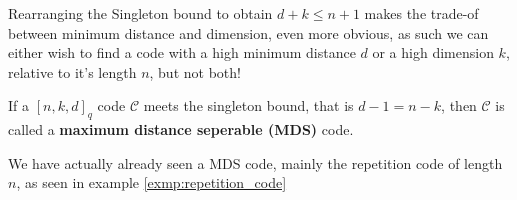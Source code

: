 \begin{remark}
  Rearranging the Singleton bound to obtain $d + k \leq n + 1$ makes the trade-of between minimum distance and dimension, even more obvious, as such we can either wish to find a code with a high minimum distance $d$ or a high dimension $k$, relative to it's length $n$, but not both!
\end{remark}

\begin{definition}\label{def:MDS_code}
  If a $[n, k, d]_{q}$ code $\mathcal{C}$ meets the singleton bound, that is $d - 1 = n - k$, then $\mathcal{C}$ is called a \textbf{maximum distance seperable (MDS)} code.
\end{definition}
We have actually already seen a MDS code, mainly the repetition code of length $n$, as seen in example \ref{exmp:repetition_code}


